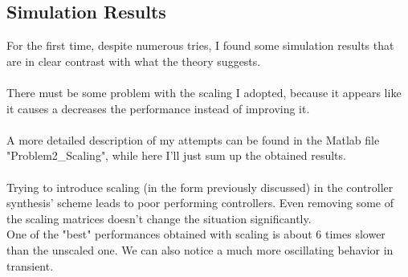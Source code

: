 \documentclass[a4paper, 12pt]{article}
\begin{document}
\subsection{Simulation Results}
For the first time, despite numerous tries, I found some simulation results that are in clear contrast with what the theory suggests. 
\\\\
There must be some problem with the scaling I adopted, because it appears like it causes a decreases the performance instead of improving it.
\\\\
A more detailed description of my attempts can be found in the Matlab file "Problem2\_Scaling", while here I'll just sum up the obtained results.
\\\\
Trying to introduce scaling (in the form previously discussed) in the controller synthesis' scheme leads to poor performing controllers. Even removing some of the scaling matrices doesn't change the situation significantly. 
\\
One of the "best" performances obtained with scaling is about 6 times slower than the unscaled one. 
We can also notice a much more oscillating behavior in transient.
\end{document}
